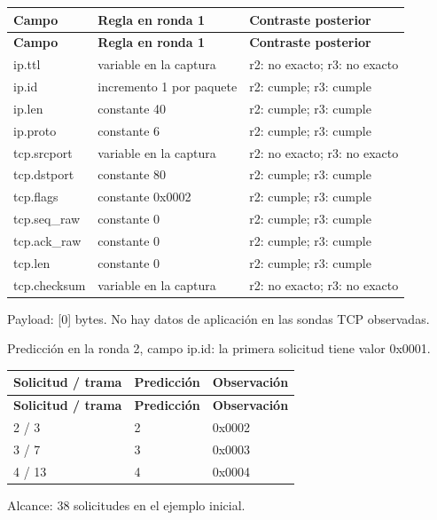 \begingroup
\fontsize{9}{11}\selectfont
\addtocounter{table}{-1}
\begin{longtable}{p{3.1cm}p{5.8cm}p{5.1cm}}
\toprule
\textbf{Campo} & \textbf{Regla en ronda 1} & \textbf{Contraste posterior} \\ \midrule
\endfirsthead
\toprule
\textbf{Campo} & \textbf{Regla en ronda 1} & \textbf{Contraste posterior} \\ \midrule
\endhead
ip.ttl & variable en la captura & r2: no exacto; r3: no exacto \\
ip.id & incremento 1 por paquete & r2: cumple; r3: cumple \\
ip.len & constante 40 & r2: cumple; r3: cumple \\
ip.proto & constante 6 & r2: cumple; r3: cumple \\
tcp.srcport & variable en la captura & r2: no exacto; r3: no exacto \\
tcp.dstport & constante 80 & r2: cumple; r3: cumple \\
tcp.flags & constante 0x0002 & r2: cumple; r3: cumple \\
tcp.seq\_\allowbreak{}raw & constante 0 & r2: cumple; r3: cumple \\
tcp.ack\_\allowbreak{}raw & constante 0 & r2: cumple; r3: cumple \\
tcp.len & constante 0 & r2: cumple; r3: cumple \\
tcp.checksum & variable en la captura & r2: no exacto; r3: no exacto \\
\bottomrule
\end{longtable}
\endgroup
Payload: [0] bytes. No hay datos de aplicación en las sondas TCP observadas.

Predicción en la ronda 2, campo ip.id: la primera solicitud tiene valor 0x0001. 

\begingroup
\fontsize{9}{11}\selectfont
\addtocounter{table}{-1}
\begin{longtable}{p{3.2cm}p{5.1cm}p{5.1cm}}
\toprule
\textbf{Solicitud / trama} & \textbf{Predicción} & \textbf{Observación} \\ \midrule
\endfirsthead
\toprule
\textbf{Solicitud / trama} & \textbf{Predicción} & \textbf{Observación} \\ \midrule
\endhead
2 / 3 & 2 & 0x0002 \\
3 / 7 & 3 & 0x0003 \\
4 / 13 & 4 & 0x0004 \\
\bottomrule
\end{longtable}
\endgroup
Alcance: 38 solicitudes en el ejemplo inicial. 

